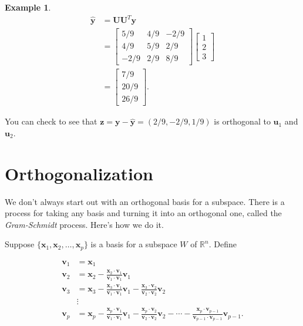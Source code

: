 \documentclass[
]{book}
\theoremstyle{definition}
\theoremstyle{definition}
\newtheorem{example}{Example}[chapter]
\theoremstyle{definition}
\theoremstyle{definition}
\theoremstyle{remark}
\begin{document}
\begin{examplebox}
\begin{example}
\begin{align*}
\hat{\mathbf{y}}&=\mathbf{U}\mathbf{U}^T\mathbf{y}\\
&=\begin{bmatrix} 5/9 & 4/9 & -2/9\\ 4/9 & 5/9 & 2/9\\ -2/9 & 2/9 & 8/9\end{bmatrix}\begin{bmatrix}1\\2\\3\end{bmatrix}\\
&=\begin{bmatrix}7/9\\20/9\\26/9\end{bmatrix}.
\end{align*}

You can check to see that \(\mathbf{z}=\mathbf{y}-\hat{\mathbf{y}}=(2/9,-2/9,1/9)\) is orthogonal to \(\mathbf{u}_1\) and \(\mathbf{u}_2\).
\end{example}

\end{examplebox}

\section{Orthogonalization}\label{orthogonalization}

We don't always start out with an orthogonal basis for a subspace. There is a process for taking any basis and turning it into an orthogonal one, called the \emph{Gram-Schmidt} process. Here's how we do it.

Suppose \(\{\mathbf{x}_1,\mathbf{x}_2,\dots,\mathbf{x}_p\}\) is a basis for a subspace \(W\) of \(\mathbb{R}^n\). Define

\begin{align}
    \mathbf{v}_1&=\mathbf{x}_1\\ \nonumber
    \mathbf{v}_2&=\mathbf{x}_2-\frac{\mathbf{x}_2\cdot \mathbf{v}_1}{\mathbf{v}_1\cdot\mathbf{v}_1}\mathbf{v}_1\\ \nonumber
    \mathbf{v}_3&=\mathbf{x}_3-\frac{\mathbf{x}_3\cdot \mathbf{v}_1}{\mathbf{v}_1\cdot\mathbf{v}_1}\mathbf{v}_1-\frac{\mathbf{x}_3\cdot \mathbf{v}_2}{\mathbf{v}_2\cdot \mathbf{v}_2}\mathbf{v}_2\\ \nonumber
    &\vdots\\ \nonumber
    \mathbf{v}_p&=\mathbf{x}_p-\frac{\mathbf{x}_p\cdot \mathbf{v}_1}{\mathbf{v}_1\cdot\mathbf{v}_1}\mathbf{v}_1-\frac{\mathbf{x}_p\cdot \mathbf{v}_2}{\mathbf{v}_2\cdot \mathbf{v}_2}\mathbf{v}_2-\cdots -\frac{\mathbf{x}_p\cdot \mathbf{v}_{p-1}}{\mathbf{v}_{p-1}\cdot \mathbf{v}_{p-1}}\mathbf{v}_{p-1}.
    \label{eq:gs}
\end{align}
\end{document}
